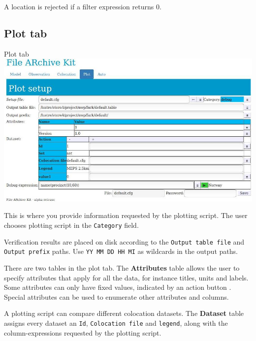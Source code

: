 \documentclass[letterpaper,10pt,twoside,twocolumn,openany]{book}
\begin{document}
\begin{quotebox}
  A location is rejected if a filter expression returns 0.
\end{quotebox}


\subsection{Plot tab}

\begin{paperbox}{Plot tab}
  \includegraphics[width=\columnwidth]{fark_plot.jpg}
\end{paperbox}

This is where you provide information requested by the plotting script.
The user chooses plotting script in the \lstinline!Category! field.

Verification results are placed on disk according to the \lstinline!Output table file! and \lstinline!Output prefix! paths.
Use \lstinline!YY MM DD HH MI! as wildcards in the output paths.

There are two tables in the plot tab. 
The {\bf Attributes} table allows the user to specify attributes that apply for all the data,
for instance titles, units and labels.
Some attributes can only have fixed values, indicated by an action button
 .
Special attributes can be used to enumerate other attributes and columns.

A plotting script can compare different colocation datasets.
The {\bf Dataset} table assigns every dataset an \lstinline!Id!, \lstinline!Colocation file! and 
\lstinline!legend!, along with the column-expressions requested by the plotting script.
\end{document}
